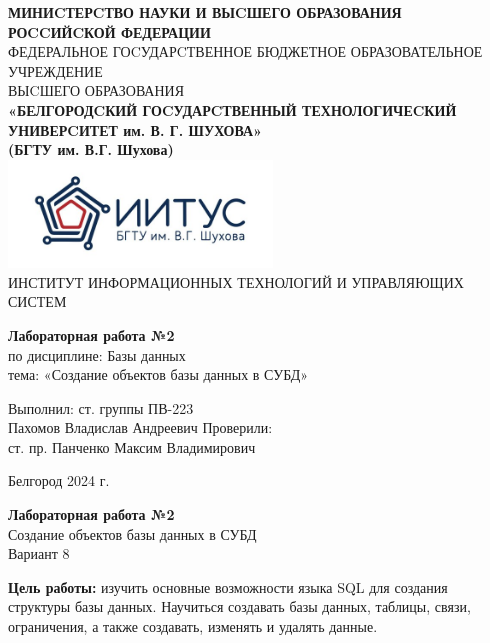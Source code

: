 \documentclass[a4paper,14pt]{extarticle}
\newcommand\textbox[1]{
	\parbox{.45\textwidth}{#1}
}
\begin{document}
\begin{center}
    \small{
        \textbf{МИНИCТЕРCТВО НАУКИ И ВЫCШЕГО ОБРАЗОВАНИЯ РОCCИЙCКОЙ ФЕДЕРАЦИИ}\\
        ФЕДЕРАЛЬНОЕ ГОCУДАРCТВЕННОЕ БЮДЖЕТНОЕ ОБРАЗОВАТЕЛЬНОЕ УЧРЕЖДЕНИЕ\\ВЫCШЕГО ОБРАЗОВАНИЯ \\
        \textbf{«БЕЛГОРОДCКИЙ ГОCУДАРCТВЕННЫЙ ТЕХНОЛОГИЧЕCКИЙ\\УНИВЕРCИТЕТ им. В. Г. ШУХОВА»\\ (БГТУ им. В.Г. Шухова)} \\
        \bigbreak
        \includegraphics[width=70mm]{log}\\
        ИНСТИТУТ ИНФОРМАЦИОННЫХ ТЕХНОЛОГИЙ И УПРАВЛЯЮЩИХ СИСТЕМ\\}
\end{center}

\vfill
\begin{center}
    \large{
        \textbf{
            Лабораторная работа №2}}\\
    \normalsize{
        по дисциплине: Базы данных \\
        тема: «Создание объектов базы данных в СУБД»}
\end{center}
\vfill
\hfill\textbox{
    Выполнил: ст. группы ПВ-223\\Пахомов Владислав Андреевич
    \bigbreak
    Проверили: \\ст. пр. Панченко Максим Владимирович
}
\vfill\begin{center}
    Белгород 2024 г.
\end{center}
\newpage
\begin{center}
    \textbf{Лабораторная работа №2}\\
    Создание объектов базы данных в СУБД\\
    Вариант 8
\end{center}
\textbf{Цель работы: }изучить основные возможности языка SQL для создания 
структуры базы данных. Научиться создавать базы данных, таблицы, связи, 
ограничения, а также создавать, изменять и удалять данные. 
\end{document}
